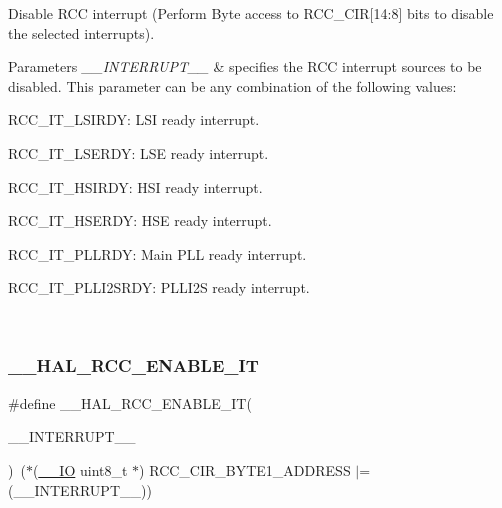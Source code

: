 Disable R\+CC interrupt (Perform Byte access to R\+C\+C\+\_\+\+C\+IR\mbox{[}14\+:8\mbox{]} bits to disable the selected interrupts). 


\begin{DoxyParams}{Parameters}
{\em \+\_\+\+\_\+\+I\+N\+T\+E\+R\+R\+U\+P\+T\+\_\+\+\_\+} & specifies the R\+CC interrupt sources to be disabled. This parameter can be any combination of the following values\+: \begin{DoxyItemize}
\item R\+C\+C\+\_\+\+I\+T\+\_\+\+L\+S\+I\+R\+DY\+: L\+SI ready interrupt. \item R\+C\+C\+\_\+\+I\+T\+\_\+\+L\+S\+E\+R\+DY\+: L\+SE ready interrupt. \item R\+C\+C\+\_\+\+I\+T\+\_\+\+H\+S\+I\+R\+DY\+: H\+SI ready interrupt. \item R\+C\+C\+\_\+\+I\+T\+\_\+\+H\+S\+E\+R\+DY\+: H\+SE ready interrupt. \item R\+C\+C\+\_\+\+I\+T\+\_\+\+P\+L\+L\+R\+DY\+: Main P\+LL ready interrupt. \item R\+C\+C\+\_\+\+I\+T\+\_\+\+P\+L\+L\+I2\+S\+R\+DY\+: P\+L\+L\+I2S ready interrupt. \end{DoxyItemize}
\\
\hline
\end{DoxyParams}
\mbox{\label{group___r_c_c___flags___interrupts___management_ga180fb20a37b31a6e4f7e59213a6c0405}} 
\subsubsection{\texorpdfstring{\+\_\+\+\_\+\+H\+A\+L\+\_\+\+R\+C\+C\+\_\+\+E\+N\+A\+B\+L\+E\+\_\+\+IT}{\_\_HAL\_RCC\_ENABLE\_IT}}
{\footnotesize\ttfamily \#define \+\_\+\+\_\+\+H\+A\+L\+\_\+\+R\+C\+C\+\_\+\+E\+N\+A\+B\+L\+E\+\_\+\+IT(\begin{DoxyParamCaption}\item[{}]{\+\_\+\+\_\+\+I\+N\+T\+E\+R\+R\+U\+P\+T\+\_\+\+\_\+ }\end{DoxyParamCaption})~($\ast$(\mbox{\hyperlink{core__sc300_8h_aec43007d9998a0a0e01faede4133d6be}{\+\_\+\+\_\+\+IO}} uint8\+\_\+t $\ast$) R\+C\+C\+\_\+\+C\+I\+R\+\_\+\+B\+Y\+T\+E1\+\_\+\+A\+D\+D\+R\+E\+SS $\vert$= (\+\_\+\+\_\+\+I\+N\+T\+E\+R\+R\+U\+P\+T\+\_\+\+\_\+))}



